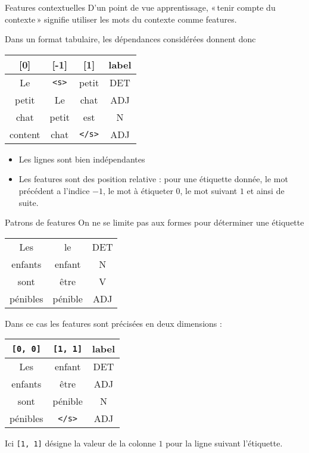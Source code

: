 \documentclass[../allslides.tex]{subfiles}
\begin{document}
\begin{frame}[fragile=singleslide]{Features contextuelles}
	D'un point de vue apprentissage, « tenir compte du contexte » signifie utiliser les mots du contexte comme \alert{features}.

	Dans un format tabulaire, les dépendances considérées donnent donc
	\begin{table}
		\begin{tabu} to .9\textwidth {cccc}
			[0]	& [-1]	& [1]	& label\\
			\midrule
			Le	& \texttt{<s>}	& petit	& DET\\
			petit	& Le	& chat	& ADJ\\
			chat	& petit	& est	& N\\
			content	& chat	& \texttt{</s>}	& ADJ
		\end{tabu}
	\end{table}

	\begin{itemize}
		\item Les lignes sont bien indépendantes
		\item Les features sont des position relative : pour une étiquette donnée, le mot précédent a l'indice $-1$, le mot à étiqueter $0$, le mot suivant $1$ et ainsi de suite.
	\end{itemize}
\end{frame}

\begin{frame}[fragile=singleslide]{Patrons de features}
	On ne se limite pas aux formes pour déterminer une étiquette
	\vspace{-\smallskipamount}
	\begin{table}
		\begin{tabu} to .9\textwidth {ccc}
			Les	& le	& DET\\
			enfants	& enfant	& N\\
			sont	& être	& V\\
			pénibles & pénible	& ADJ
		\end{tabu}
	\end{table}
	\vspace{-\smallskipamount}
	Dans ce cas les features sont précisées en deux dimensions :
	\begin{table}
		\begin{tabu} to .9\textwidth {ccc}
			\texttt{[0, 0]}	& \texttt{[1, 1]}	& label\\
			\midrule
			Les	& enfant 	& DET\\
			enfants	& être 	& ADJ\\
			sont	& pénible 	& N\\
			pénibles	& \texttt{</s>}	& ADJ
		\end{tabu}
	\end{table}
	\vspace{-1.5\smallskipamount}
	Ici \texttt{[1, 1]} désigne la valeur de la colonne $1$ pour la ligne suivant l'étiquette.
\end{frame}
\end{document}
